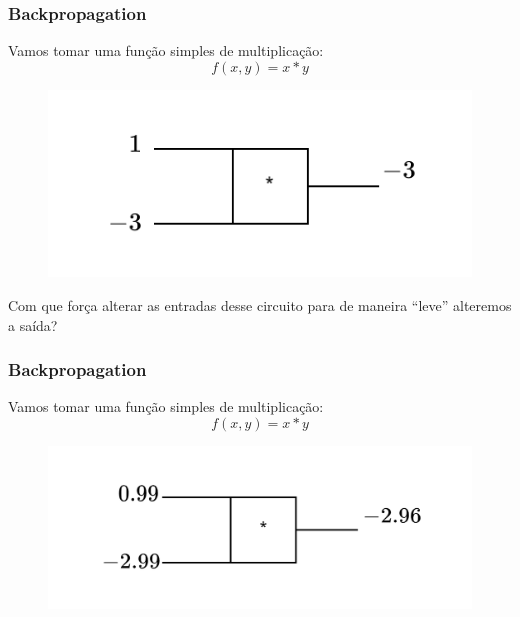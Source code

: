 \documentclass{beamer}
\begin{document}
\begin{frame}
	\frametitle{Backpropagation}
	\begin{example}
		Vamos tomar uma função simples de multiplicação:
		$$f(x, y) = x * y$$
		
		\begin{figure}
			\centering
			\includegraphics[width=0.5\linewidth]{figures/simple_multiply_gate_part1}
		\end{figure}
		\alert{Com que força alterar as entradas desse circuito para de maneira ``leve'' alteremos a saída?}
	\end{example}
\end{frame}
\begin{frame}
	\frametitle{Backpropagation}
	\begin{example}
		Vamos tomar uma função simples de multiplicação:
		$$f(x, y) = x * y$$
		
\begin{figure}
	\centering
	\includegraphics[width=0.5\linewidth]{figures/simple_multiply_gate_part2}
\end{figure}
		
	\end{example}
\end{frame}
\end{document}

